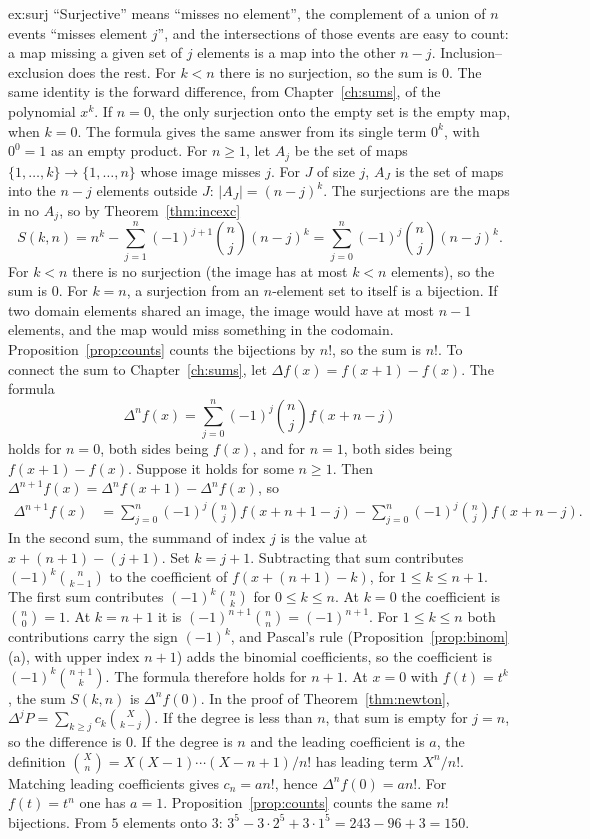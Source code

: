 \begin{solution}{ex:surj}
\idea ``Surjective'' means ``misses no element'', the complement of a union of $n$ events ``misses element $j$'', and the intersections of those events are easy to count: a map missing a given set of $j$ elements is a map into the other $n-j$. Inclusion--exclusion does the rest. For $k<n$ there is no surjection, so the sum is $0$. The same identity is the forward difference, from Chapter~\ref{ch:sums}, of the polynomial $x^k$.
\writeup If $n=0$, the only surjection onto the empty set is the empty map, when $k=0$. The formula gives the same answer from its single term $0^k$, with $0^0=1$ as an empty product. For $n\ge1$, let $A_j$ be the set of maps $\{1,\dots,k\}\to\{1,\dots,n\}$ whose image misses $j$. For $J$ of size $j$, $A_J$ is the set of maps into the $n-j$ elements outside $J$: $|A_J|=(n-j)^k$. The surjections are the maps in no $A_j$, so by Theorem~\ref{thm:incexc}
\[
S(k,n)=n^k-\sum_{j=1}^n(-1)^{j+1}\binom nj(n-j)^k=\sum_{j=0}^n(-1)^j\binom nj(n-j)^k .
\]
For $k<n$ there is no surjection (the image has at most $k<n$ elements), so the sum is $0$. For $k=n$, a surjection from an $n$-element set to itself is a bijection. If two domain elements shared an image, the image would have at most $n-1$ elements, and the map would miss something in the codomain. Proposition~\ref{prop:counts} counts the bijections by $n!$, so the sum is $n!$. To connect the sum to Chapter~\ref{ch:sums}, let $\Delta f(x)=f(x+1)-f(x)$. The formula
\[
\Delta^n f(x)=\sum_{j=0}^n(-1)^j\binom nj f(x+n-j)
\]
holds for $n=0$, both sides being $f(x)$, and for $n=1$, both sides being $f(x+1)-f(x)$. Suppose it holds for some $n\ge1$. Then $\Delta^{n+1}f(x)=\Delta^n f(x+1)-\Delta^n f(x)$, so
\begin{align*}
\Delta^{n+1}f(x)
&=\sum_{j=0}^n(-1)^j\binom nj f(x+n+1-j)
-\sum_{j=0}^n(-1)^j\binom nj f(x+n-j).
\end{align*}
In the second sum, the summand of index $j$ is the value at $x+(n+1)-(j+1)$. Set $k=j+1$. Subtracting that sum contributes $(-1)^k\binom n{k-1}$ to the coefficient of $f(x+(n+1)-k)$, for $1\le k\le n+1$. The first sum contributes $(-1)^k\binom nk$ for $0\le k\le n$. At $k=0$ the coefficient is $\binom n0=1$. At $k=n+1$ it is $(-1)^{n+1}\binom nn=(-1)^{n+1}$. For $1\le k\le n$ both contributions carry the sign $(-1)^k$, and Pascal's rule (Proposition~\ref{prop:binom}(a), with upper index $n+1$) adds the binomial coefficients, so the coefficient is $(-1)^k\binom{n+1}k$. The formula therefore holds for $n+1$. At $x=0$ with $f(t)=t^k$, the sum $S(k,n)$ is $\Delta^n f(0)$. In the proof of Theorem~\ref{thm:newton}, $\Delta^j P=\sum_{k\ge j}c_k\binom X{k-j}$. If the degree is less than $n$, that sum is empty for $j=n$, so the difference is $0$. If the degree is $n$ and the leading coefficient is $a$, the definition $\binom Xn=X(X-1)\cdots(X-n+1)/n!$ has leading term $X^n/n!$. Matching leading coefficients gives $c_n=an!$, hence $\Delta^n f(0)=an!$. For $f(t)=t^n$ one has $a=1$. Proposition~\ref{prop:counts} counts the same $n!$ bijections. From $5$ elements onto $3$: $3^5-3\cdot2^5+3\cdot1^5=243-96+3=150$.
\end{solution}

